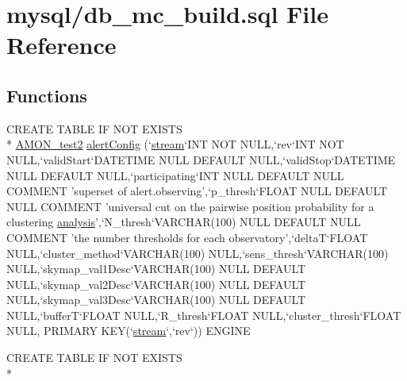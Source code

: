\hypertarget{db__mc__build_8sql}{\section{mysql/db\-\_\-mc\-\_\-build.sql File Reference}
\label{db__mc__build_8sql}
}
\subsection*{Functions}
\begin{DoxyCompactItemize}
\item 
C\-R\-E\-A\-T\-E T\-A\-B\-L\-E I\-F N\-O\-T E\-X\-I\-S\-T\-S \\*
\hyperlink{db__mc__build_8sql_a19c21c59303d8b6591b92240ff7de1d5}{A\-M\-O\-N\-\_\-test2} \hyperlink{db__mc__build_8sql_a59c95167d94d5f5b33fb03d5d96d7af9}{alert\-Config} (`\hyperlink{db__mc__build_8sql_a67b7e9fc922cbf49b5ae3124240f4188}{stream}`I\-N\-T N\-O\-T N\-U\-L\-L,`rev`I\-N\-T N\-O\-T N\-U\-L\-L,`valid\-Start`D\-A\-T\-E\-T\-I\-M\-E N\-U\-L\-L D\-E\-F\-A\-U\-L\-T N\-U\-L\-L,`valid\-Stop`D\-A\-T\-E\-T\-I\-M\-E N\-U\-L\-L D\-E\-F\-A\-U\-L\-T N\-U\-L\-L,`participating`I\-N\-T N\-U\-L\-L D\-E\-F\-A\-U\-L\-T N\-U\-L\-L C\-O\-M\-M\-E\-N\-T 'superset of alert.\-observing',`p\-\_\-thresh`F\-L\-O\-A\-T N\-U\-L\-L D\-E\-F\-A\-U\-L\-T N\-U\-L\-L C\-O\-M\-M\-E\-N\-T 'universal cut on the pairwise position probability for a clustering \hyperlink{db__mc__build_8sql_aa58c5a0f4948ad11fd4eaaba444e9e22}{analysis}',`N\-\_\-thresh`V\-A\-R\-C\-H\-A\-R(100) N\-U\-L\-L D\-E\-F\-A\-U\-L\-T N\-U\-L\-L C\-O\-M\-M\-E\-N\-T 'the number thresholds for each observatory',`delta\-T`F\-L\-O\-A\-T N\-U\-L\-L,`cluster\-\_\-method`V\-A\-R\-C\-H\-A\-R(100) N\-U\-L\-L,`sens\-\_\-thresh`V\-A\-R\-C\-H\-A\-R(100) N\-U\-L\-L,`skymap\-\_\-val1\-Desc`V\-A\-R\-C\-H\-A\-R(100) N\-U\-L\-L D\-E\-F\-A\-U\-L\-T N\-U\-L\-L,`skymap\-\_\-val2\-Desc`V\-A\-R\-C\-H\-A\-R(100) N\-U\-L\-L D\-E\-F\-A\-U\-L\-T N\-U\-L\-L,`skymap\-\_\-val3\-Desc`V\-A\-R\-C\-H\-A\-R(100) N\-U\-L\-L D\-E\-F\-A\-U\-L\-T N\-U\-L\-L,`buffer\-T`F\-L\-O\-A\-T N\-U\-L\-L,`R\-\_\-thresh`F\-L\-O\-A\-T N\-U\-L\-L,`cluster\-\_\-thresh`F\-L\-O\-A\-T N\-U\-L\-L, P\-R\-I\-M\-A\-R\-Y K\-E\-Y(`\hyperlink{db__mc__build_8sql_a67b7e9fc922cbf49b5ae3124240f4188}{stream}`,`rev`)) E\-N\-G\-I\-N\-E
\item 
C\-R\-E\-A\-T\-E T\-A\-B\-L\-E I\-F N\-O\-T E\-X\-I\-S\-T\-S \\*

\end{DoxyCompactItemize}
